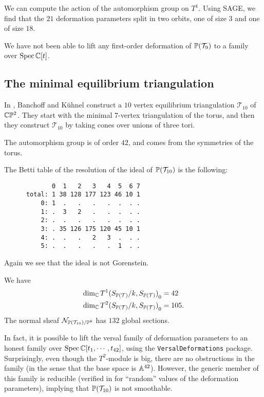 We can compute the action of the automorphism group on $T^1$. Using SAGE, we find that the $21$ deformation parameters split in two orbits, one of size $3$ and one of size $18$.

We have not been able to lift any first-order deformation of $\P(\mathcal T_9)$ to a family over $\Spec \C[t]$. 

\subsection{The minimal equilibrium triangulation}

In \cite{banchoff_equilibrium}, Banchoff and Kühnel construct a $10$ vertex equilibrium triangulation $\mathcal T_{10}$  of $\C \P^2$. They start with the minimal $7$-vertex triangulation of the torus, and then they construct $\mathcal T_{10}$ by taking cones over unions of three tori.

The automorphism group is of order $42$, and comes from the symmetries of the torus. 

The Betti table of the resolution of the ideal of $\P(\mathcal T_{10})$ is the following:
\begin{verbatim}
             0  1   2   3   4  5  6 7
      total: 1 38 128 177 123 46 10 1
          0: 1  .   .   .   .  .  . .
          1: .  3   2   .   .  .  . .
          2: .  .   .   .   .  .  . .
          3: . 35 126 175 120 45 10 1
          4: .  .   .   2   3  .  . .
          5: .  .   .   .   .  1  . .
\end{verbatim}

Again we see that the ideal is not Gorenstein.

\begin{proposition}
We have 
\begin{align*}
\dim_\C  {T^1(S_{\P(\mathcal T)}/k, S_{\P(\mathcal T)})}_0 &= 42 \\
\dim_\C {T^2(S_{\P(\mathcal T)}/k, S_{\P(\mathcal T)})}_0  &= 105.
\end{align*}
The normal sheaf $\mathcal N_{\P(\mathcal T_{10})/\P^{8}}$ has $132$ global sections.
\end{proposition}

In fact, it is possible to lift the versal family of deformation parameters to an honest family over $\Spec \C[t_1,\cdots,t_{42}]$, using the \texttt{VersalDeformations} package. Surprisingly, even though the $T^2$-module is big, there are no obstructions in the family (in the sense that the base space is $\A^{42}$). However, the generic member of this family is reducible (verified in \MM for ``random'' values of the deformation parameters), implying that $\P(\mathcal T_{10})$ is not smoothable.

